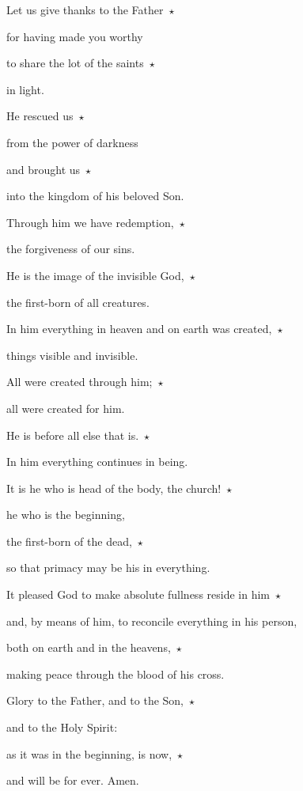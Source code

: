 \noindent Let us give thanks to the Father~$\star$~\nopagebreak

for having made you worthy

\noindent to share the lot of the saints~$\star$~\nopagebreak

in light.

\noindent He rescued us~$\star$~\nopagebreak

from the power of darkness

\noindent and brought us~$\star$~\nopagebreak

into the kingdom of his beloved Son.

\noindent Through him we have redemption,~$\star$~\nopagebreak

the forgiveness of our sins.

\noindent He is the image of the invisible God,~$\star$~\nopagebreak

the first-born of all creatures.

\noindent In him everything in heaven and on earth was created,~$\star$~\nopagebreak

things visible and invisible.

\noindent All were created through him;~$\star$~\nopagebreak

all were created for him.

\noindent He is before all else that is.~$\star$~\nopagebreak

In him everything continues in being.

\noindent It is he who is head of the body, the church!~$\star$~\nopagebreak

he who is the beginning,

\noindent the first-born of the dead,~$\star$~\nopagebreak

so that primacy may be his in everything.

\noindent It pleased God to make absolute fullness reside in him~$\star$~\nopagebreak

and, by means of him, to reconcile everything in his person,

\noindent both on earth and in the heavens,~$\star$~\nopagebreak

making peace through the blood of his cross.

\noindent Glory to the Father, and to the Son,~$\star$~\nopagebreak

and to the Holy Spirit:

\noindent as it was in the beginning, is now,~$\star$~\nopagebreak

and will be for ever. Amen.
